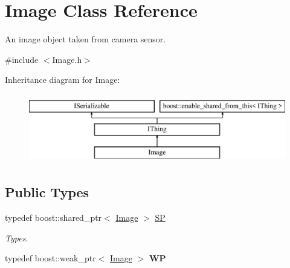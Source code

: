 \hypertarget{class_image}{}\section{Image Class Reference}
\label{class_image}


An image object taken from camera sensor.  




{\ttfamily \#include $<$Image.\+h$>$}

Inheritance diagram for Image\+:\begin{figure}[H]
\begin{center}
\leavevmode
\includegraphics[height=3.000000cm]{class_image}
\end{center}
\end{figure}
\subsection*{Public Types}
\begin{DoxyCompactItemize}
\item 
\mbox{\label{class_image_a441de502d70eb0b0a61de6fe6ad6a5fd}} 
typedef boost\+::shared\+\_\+ptr$<$ \hyperlink{class_image}{Image} $>$ \hyperlink{class_image_a441de502d70eb0b0a61de6fe6ad6a5fd}{SP}
\begin{DoxyCompactList}\small\item\em Types. \end{DoxyCompactList}\item 
\mbox{\label{class_image_a07fed06f62da98370fdf5037109fb862}} 
typedef boost\+::weak\+\_\+ptr$<$ \hyperlink{class_image}{Image} $>$ {\bfseries WP}
\end{DoxyCompactItemize}

